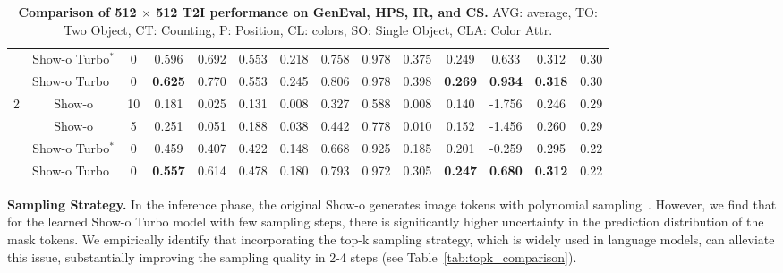 \begin{table*}[t]
\begin{tabular}{ccc|ccccccc|ccc|c}
         & Show-o Turbo$^*$ & 0 & 0.596 & 0.692 & 0.553 & 0.218 & 0.758 & 0.978 & 0.375 & 0.249 & 0.633 & 0.312 & 0.30 \\
         & Show-o Turbo$\;\,$ & 0 & \textbf{0.625} & 0.770 & 0.553 & 0.245 & 0.806 & 0.978 & 0.398 & \textbf{0.269} & \textbf{0.934} & \textbf{0.318} & 0.30 \\
         \midrule
         \multirow{4}{*}{2} & Show-o & 10 & 0.181 & 0.025 & 0.131 & 0.008 & 0.327 & 0.588 & 0.008 & 0.140 & -1.756 & 0.246 & 0.29 \\
         & Show-o & 5 & 0.251 & 0.051 & 0.188 & 0.038 & 0.442 & 0.778 & 0.010 & 0.152 & -1.456 & 0.260 & 0.29 \\
         & Show-o Turbo$^*$ & 0 & 0.459 & 0.407 & 0.422 & 0.148 & 0.668 & 0.925 & 0.185 & 0.201 & -0.259 & 0.295 & 0.22 \\
         & Show-o Turbo$\;\,$ & 0 & \textbf{0.557} & 0.614 & 0.478 & 0.180 & 0.793 & 0.972 & 0.305 & \textbf{0.247} & \textbf{0.680} & \textbf{0.312} & 0.22 \\
        \bottomrule
    \end{tabular}
    \caption{\textbf{Comparison of 512 $\times$ 512 T2I performance on GenEval, HPS, IR, and CS.}
    AVG: average, TO: Two Object, CT: Counting, P: Position, CL: colors, SO: Single Object, CLA: Color Attr. }
    \label{tab:merged_method_comparison}
\end{table*}

\noindent \textbf{Sampling Strategy.}
In the inference phase, the original Show-o generates image tokens with polynomial sampling~\cite{xie2024show}. 
However, we find that for the learned Show-o Turbo model with few sampling steps, there is significantly higher uncertainty in the prediction distribution of the mask tokens.
We empirically identify that incorporating the top-k sampling strategy, which is widely used in language models, can alleviate this issue, substantially improving the sampling quality in 2-4 steps (see Table~\ref{tab:topk_comparison}). 

